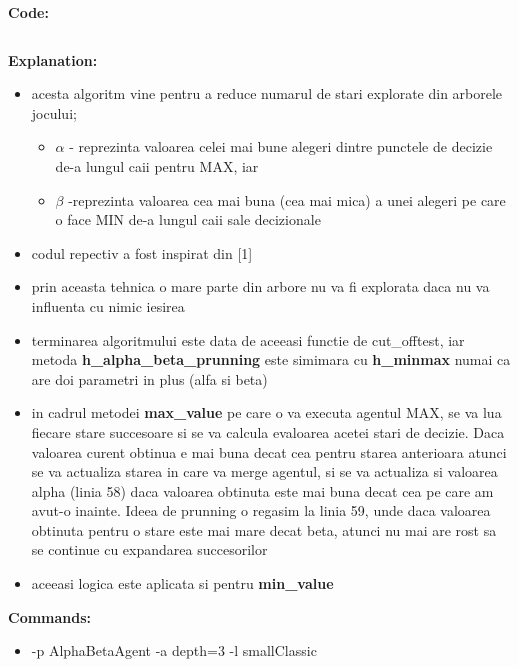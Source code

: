 \textbf{Code:}

\inputminted[linenos]{python}{code/10_ab_prunning.py}


\textbf{Explanation:}
\begin{itemize}
    \setlength\itemsep{0em}
    \item acesta algoritm vine pentru a reduce numarul de stari explorate din arborele jocului; 
     \begin{itemize}
        \setlength\itemsep{0em}
        \item$\alpha$ - reprezinta valoarea celei mai bune alegeri dintre punctele de decizie de-a lungul caii pentru MAX, iar 
        \item $\beta$ -reprezinta valoarea cea mai buna (cea mai mica) a unei alegeri pe care o face MIN de-a lungul caii sale decizionale
        \end{itemize}
    \item codul repectiv a fost inspirat din [1] 
    \item prin aceasta tehnica o mare parte din arbore nu va fi explorata daca nu va influenta cu nimic iesirea
    \item terminarea algoritmului este data de aceeasi functie de cut\_off\-test, iar metoda \textbf{h\_alpha\_beta\_prunning} este simimara cu \textbf{h\_minmax} numai ca are doi parametri in plus (alfa si beta)
    \item in cadrul metodei \textbf{max\_value} pe care o va executa agentul MAX, se va lua fiecare stare succesoare si se va calcula evaloarea acetei stari de decizie. Daca valoarea curent obtinua e mai buna decat cea pentru starea anterioara atunci se va actualiza starea in care va merge  agentul, si se va actualiza si valoarea alpha (linia 58) daca valoarea obtinuta este mai buna decat cea pe care am avut-o inainte. Ideea de prunning o regasim la linia 59, unde daca valoarea obtinuta pentru o stare este mai mare decat beta, atunci nu mai are rost sa se continue cu expandarea succesorilor
    \item aceeasi logica este aplicata si pentru \textbf{min\_value} 
    
\end{itemize}


\textbf{Commands:}
\begin{itemize}
    \setlength\itemsep{0em}
    \item  -p AlphaBetaAgent -a depth=3 -l smallClassic

        
\end{itemize}

